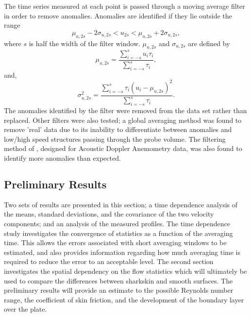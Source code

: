 \documentclass[12pt,oneside,a4paper]{article}
\begin{document}
The time series measured at each point is passed through a moving average filter in order to remove anomalies. Anomalies are identified if they lie outside the range
\begin{equation}
\mu_{u,2s} - 2 \sigma_{u,2s} < u_{2s} < \mu_{u,2s} + 2 \sigma_{u,2s},
\end{equation}
where $s$ is half the width of the filter window. $\mu_{u,2s}$ and $\sigma_{u,2s}$ are defined by 
\begin{equation}
\mu_{u,2s} = \frac{\sum^s_{i=-s} u_i \tau_i}{\sum^s_{i=-s} \tau_i}, 
\end{equation}
and,
\begin{equation}
\sigma_{u,2s}^2 = \frac{\sum^s_{i=-s} \tau_i (u_i - \mu_{u,2s})^2}{\sum^s_{i=-s} \tau_i}.
\end{equation}
The anomalies identified by the filter were removed from the data set rather than replaced. Other filters were also tested; a global averaging method was found to remove 'real' data due to its inability to differentiate between anomalies and low/high speed structures passing through the probe volume. The filtering method of \cite{goring2002}, designed for Acoustic Doppler Anemometry data, was also found to identify more anomalies than expected. 






\subsection{Preliminary Results}
Two sets of results are presented in this section; a time dependence analysis of the means, standard deviations, and the covariance of the two velocity components; and an analysis of the measured profiles. The time dependence study investigates the convergence of statistics as a function of the averaging time. This allows the errors associated with short averaging windows to be estimated, and also provides information regarding how much averaging time is required to reduce the error to an acceptable level. The second section investigates the spatial dependency on the flow statistics which will ultimately be used to compare the differences between sharkskin and smooth surfaces. The preliminary results will provide an estimate to the possible Reynolds number range, the coefficient of skin friction, and the development of the boundary layer over the plate. 
\end{document}
